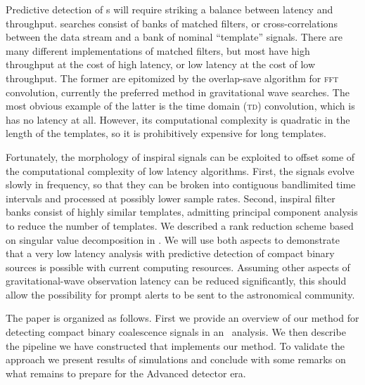 Predictive detection of \CBC{}s will require striking a balance between latency
and throughput.  \CBC{} searches consist of banks of matched filters, or
cross-correlations between the data stream and a bank of nominal ``template''
signals.  There are many different implementations of matched filters, but most
have high throughput at the cost of high latency, or low latency at the cost of
low throughput.  The former are epitomized by the overlap-save algorithm for
\textsc{fft} convolution, currently the preferred method in gravitational wave
searches.  The most obvious example of the latter is the time domain
(\textsc{td}) convolution, which is has no latency at all.  However, its
computational complexity is quadratic in the length of the templates, so it is
prohibitively expensive for long templates.

Fortunately, the morphology of inspiral signals can be exploited to offset some
of the computational complexity of low latency algorithms.  First, the signals
evolve slowly in frequency, so that they can be broken into contiguous
bandlimited time intervals and processed at possibly lower sample rates.
Second, inspiral filter banks consist of highly similar templates, admitting
principal component analysis to reduce the number of templates.  We described a
rank reduction scheme based on singular value decomposition in
\cite{Cannon:2010p10398}.  We will use both aspects to demonstrate that a very
low latency analysis with predictive detection of compact binary sources is
possible with current computing resources.  Assuming other aspects of
gravitational-wave observation latency can be reduced significantly, this
should allow the possibility for prompt alerts to be sent to the astronomical
community.

The paper is organized as follows. First we provide an overview of our method
for detecting compact binary coalescence signals in an \earlywarning\ analysis.
We then describe the pipeline we have constructed that implements our method.
To validate the approach we present results of simulations and conclude with
some remarks on what remains to prepare for the Advanced detector era.

